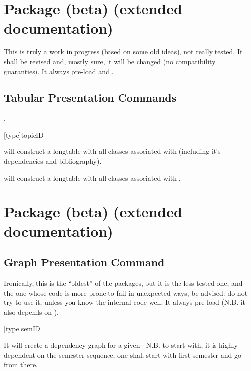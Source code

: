 \documentclass[article,nogeometry,english,tocdepth=3,secdepth=3]{ufrgscca} %
\begin{document}
\section{ Package (beta) (ex\-tend\-ed documentation)}
This is truly a work in progress (based on some old ideas), not really tested. It shall be revised and, mostly sure, it will be changed (no compatibility guaranties).  It always pre-load  and .

\subsection{Tabular Presentation Commands}
\begin{codedescribe}{\TabEtp,\TabTopic}
    \begin{codesyntax}%
        \tsmacro{\TabTopic}[type]{topicID}
    \end{codesyntax}
\tsmacro{\TabEtp}{} will construct a longtable with all classes associated with  (including it's dependencies and bibliography).

\tsmacro{\TabTopic}{} will construct a longtable with all classes associated with .

\end{codedescribe}

\section{ Package (beta) (extended documentation)}

\subsection{Graph Presentation Command}
Ironically, this is the “oldest” of the  packages, but it is the less tested one, and the one whose code is more prone to fail in unexpected ways, be advised: do not try to use it, unless you know the internal code well. It always pre-load  (N.B. it also depends on ).

\begin{codedescribe}{\GraphSem}
    \begin{codesyntax}%
        \tsmacro{\GraphSem}[type]{semID}
    \end{codesyntax}
It will create a dependency graph for a given . N.B. to start with, it is highly dependent on the semester sequence, one shall start with first semester and go from there.
\end{codedescribe}

\fi
\end{document}
